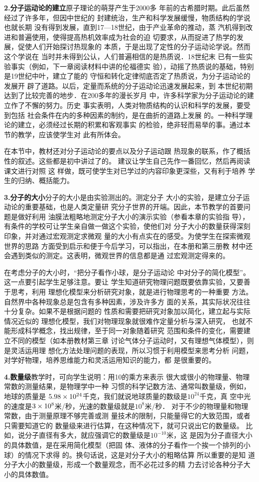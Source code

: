 \textbf{2.分子运动论的建立}\quad 原子理论的萌芽产生于2000多
年前的古希腊时期。此后虽然经过了许多年，但因中世纪的
封建统治，生产和科学发展缓慢，物质结构的学说也就长期
没有得到发展，直到17—18世纪，由于产业革命的推动，蒸
汽机得到改进和普遍使用，使得提高热机效率成为社会的迫
切要求，从而捉进了热学的发展，促使人们开始探讨热现象的
本质，于是出现了定性的分子运动论学说。然而这个学说在
当时并未得到公认，人们普遍相信的是热质说．18世纪末
已有一些实验事实（例如，下一章阅读材料中讲的伦福德实
验），动摇了热质说的基础，特别是19世纪中叶，建立了能的
守恒和转化定律彻底否定了热质说，为分子运动论的发展开
辟了道路。以后，定量而系统的分子运动论迅速发展起来，到
本世纪初期达到了比较完善的地步．在200多年的漫长岁月
中，许多科学家为分子运动论的建立作了不懈的努力。历史
事实表明，人类对物质结构的认识和科学的发展，要受到包括
社会条件在内的多种因素的制约，是在曲折的道路上发展
的。一种科学理论的建立，必须经过长期的积累和客观事实
的检验，绝非轻而易举的事。通过本节的教学，应该使学生对
此有所体会。

在本节中，教材还对分子运动论的要点以及分子运动跟
热现象的联系，作了概括性的叙述。这些都是初中讲过了的。
建议让学生自己先作一番回忆，然后再阅读课文进行对照 这
样做，既可使学生对已学过的内容印象更深些，又有利于培养
学生的归纳、概括能力。

\textbf{3.分子的大小}\quad 分子的大小是由实验测出的。测定分子
大小的实验，是建立分子运动论的重要基础，也是人类定量研
究分子世界的开端。因此，本节教学的首要问题是做好利用
油膜法粗略地测定分子大小的演示实验（参看本章的实验指
导），有条件的学校可让学生亲自做一做这个实验，使他们对
分子大小的数量获得深刻印象，并对通过宏观测定求微观
量的大小有点实在的感受。为使学生在探索微观世界的思路
方面受到启示和便于今后学习，可以指出，在本册和第三册教
材中还会遇到类似的测定。这表明，微观世界的信息都是通
过宏观测定得来的。

在考虑分子的大小时，“把分子看作小球，是分子运动论
中对分子的简化模型”。这一点要引起学生足够注意。要让
学生知道研究物理问题既要依靠实验，又要善于思考，利用
理想化模型来分析研究对象，就是进行物理思考的一种重要
方法。自然界中各种现象总是包含有多种因素，涉及许多方
面的关系，其实际状况往往十分复杂。如果不是根据问题的
性质和需要把研究对象加以简化，建立起与实际情况近似的
理想化模型，我们对物理现象就很难作定量分析与深入研究，
也就不能形成科学概念，找出规律，至于同一对象随着研究
范围和条件的变化，需要建立不同的模型（如本册教材第三章
讨论气体分子运动时，又有理想气体模型），则是灵活运用理
想化方法处理问题的表现，所以习惯于利用模型来思考分析
问题，对学好物理，培养思维能力和灵活运用知识的能力，都
是很重要的。

\textbf{4.数量级}\quad 教学时，可向学生说明：用10的乘方来表示
很大或很小的物理量、物理常数的测量结果，是物理学中一种
习惯的科学记数方法、通常叫数量级，例如，地球的质量是
$5.98\times10^{24}$千克，我们就说地球质量的数级是$10^{24}$千克，真
空中光的速度是$3\times10^8$米/秒，光速的数量级就是$10^8$米/秒．
对于不少的物理量和物理常数，由于测量原理不够完善或测
量技术的限制，只能量得它的大致范围，或者只需要知道它的
数量级来进行估算，在这种情况下，就可只说出它的数量级。
比如，说分子直径有多大，就应强调它的数量级是$10^{-10}$米，这
是因为分子直径大小的具体数值，是在采用简化模型（把固
体、液体的分子看作一个挨一个排列的小球）的情况下求得
的。换句话说，这是对分子大小的粗略估算 所以重要的是知
道分子大小的数量级，形成一个数量观念，而不必花过多的精
力去讨论各种分子大小的具体数值。

